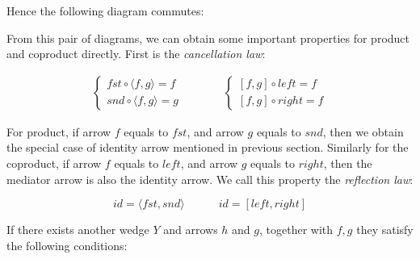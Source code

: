 \documentclass{article}
\begin{document}
Hence the following diagram commutes:

\begin{center}
\end{center}

From this pair of diagrams, we can obtain some important properties for product and coproduct directly. First is the {\em cancellation law}:

\[
\begin{array}{rcl}
\begin{cases}
fst \circ \langle f, g \rangle = f \\
snd \circ \langle f, g \rangle = g
\end{cases}
& \quad \quad &
\begin{cases}
[f, g] \circ left = f \\
[f, g] \circ right = f
\end{cases}
\end{array}
\]

For product, if arrow $f$ equals to $fst$, and arrow $g$ equals to $snd$, then we obtain the special case of identity arrow mentioned in previous section. Similarly for the coproduct, if arrow $f$ equals to $left$, and arrow $g$ equals to $right$, then the mediator arrow is also the identity arrow. We call this property the {\em reflection law}:

\[
id = \langle fst, snd \rangle \quad \quad \quad id = [left, right]
\]

If there exists another wedge $Y$ and arrows $h$ and $g$, together with $f, g$ they satisfy the following conditions:
\end{document}
